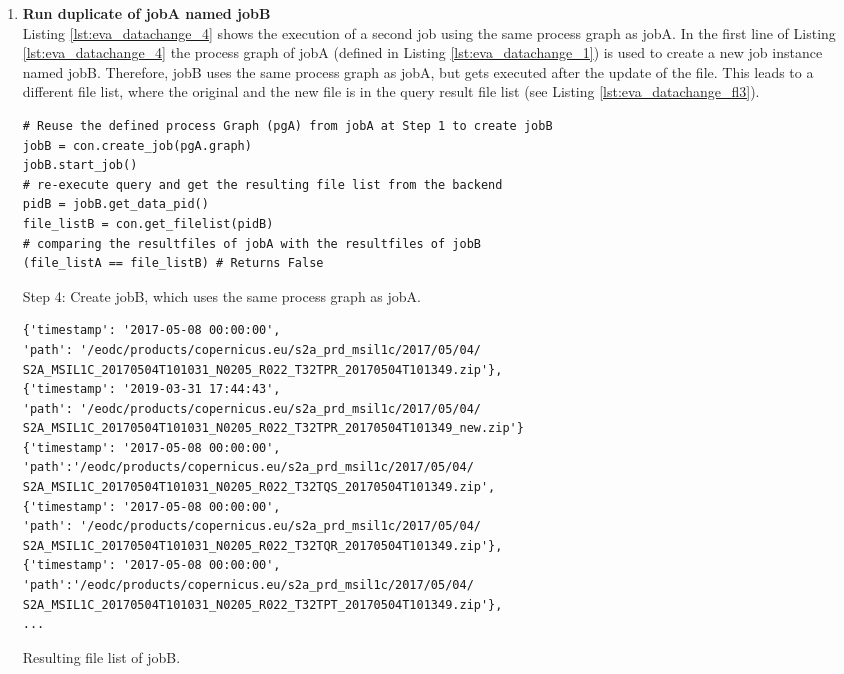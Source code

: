 \documentclass[draft,final]{vutinfth} %
\newenvironment{code}{\captionsetup{type=listing}}{}
\begin{document}
\begin{enumerate}
	\item \textbf{Run duplicate of jobA named jobB} \\
	Listing \ref{lst:eva_datachange_4} shows the execution of a second job using the same process graph as jobA. In the first line of Listing \ref{lst:eva_datachange_4} the process graph of jobA (defined in Listing \ref{lst:eva_datachange_1}) is used to create a new job instance named jobB. Therefore, jobB uses the same process graph as jobA, but gets executed after the update of the file. This leads to a different file list, where the original and the new file is in the query result file list (see Listing \ref{lst:eva_datachange_fl3}).
	\begin{code}
		\begin{verbatim}
# Reuse the defined process Graph (pgA) from jobA at Step 1 to create jobB
jobB = con.create_job(pgA.graph)
jobB.start_job()
# re-execute query and get the resulting file list from the backend
pidB = jobB.get_data_pid()
file_listB = con.get_filelist(pidB)
# comparing the resultfiles of jobA with the resultfiles of jobB
(file_listA == file_listB) # Returns False
		\end{verbatim}
		\caption{Step 4: Create jobB, which uses the same process graph as jobA.}
		\label{lst:eva_datachange_4}
	\end{code}
	
	\begin{code}
		\begin{verbatim}
{'timestamp': '2017-05-08 00:00:00', 
'path': '/eodc/products/copernicus.eu/s2a_prd_msil1c/2017/05/04/
S2A_MSIL1C_20170504T101031_N0205_R022_T32TPR_20170504T101349.zip'}, 
{'timestamp': '2019-03-31 17:44:43', 
'path': '/eodc/products/copernicus.eu/s2a_prd_msil1c/2017/05/04/
S2A_MSIL1C_20170504T101031_N0205_R022_T32TPR_20170504T101349_new.zip'}
{'timestamp': '2017-05-08 00:00:00',
'path':'/eodc/products/copernicus.eu/s2a_prd_msil1c/2017/05/04/
S2A_MSIL1C_20170504T101031_N0205_R022_T32TQS_20170504T101349.zip', 
{'timestamp': '2017-05-08 00:00:00', 
'path': '/eodc/products/copernicus.eu/s2a_prd_msil1c/2017/05/04/
S2A_MSIL1C_20170504T101031_N0205_R022_T32TQR_20170504T101349.zip'}, 
{'timestamp': '2017-05-08 00:00:00',
'path':'/eodc/products/copernicus.eu/s2a_prd_msil1c/2017/05/04/
S2A_MSIL1C_20170504T101031_N0205_R022_T32TPT_20170504T101349.zip'},
...
		\end{verbatim}
		\caption{Resulting file list of jobB.}
		\label{lst:eva_datachange_fl3}
	\end{code}
	

\end{enumerate}
\end{document}
